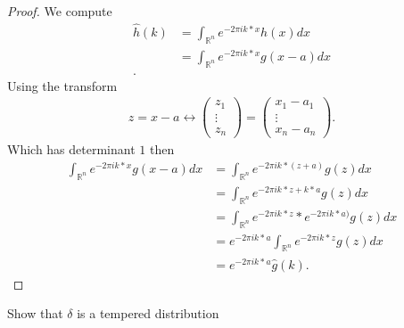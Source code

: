\begin{proof}
 We compute  
 \begin{align*}
  \hat{h}(k)  &= \int_{\mathbb{R}^{n} } e^{-2\pi ik*x}h(x) dx  \\
               &=   \int_{\mathbb{R}^{n} } e^{-2\pi ik*x}g(x-a) dx  \\
 .\end{align*}
 Using the transform 
 \begin{align*}
  z = x-a \leftrightarrow \begin{pmatrix} z_{1} \\ \vdots \\ z_n \end{pmatrix}  = \begin{pmatrix} x_{1}-a_{1} \\ \vdots \\ x_n-a_n \end{pmatrix} 
 .\end{align*}
 Which has determinant $1$ then 
 \begin{align*}
   \int_{\mathbb{R}^{n} } e^{-2\pi ik*x}g(x-a) dx &= \int_{\mathbb{R}^{n} } e^{-2\pi ik*(z+a)}g(z) dx\\
                                                  &= \int_{\mathbb{R}^{n} } e^{-2\pi ik*z+k*a}g(z) dx\\
                                                  &= \int_{\mathbb{R}^{n} } e^{-2\pi ik*z}*e^{-2\pi ik*a)}g(z) dx\\
                                                  &= e^{-2\pi ik*a}\int_{\mathbb{R}^{n} } e^{-2\pi ik*z}g(z) dx\\
                                                  &= e^{-2\pi ik*a} \hat{g}(k) 
 .\end{align*}
\end{proof}
\begin{exercise}[e]
 Show that $\delta $  is a tempered distribution
\end{exercise}
